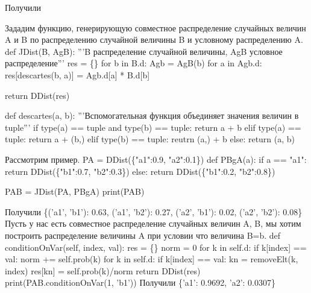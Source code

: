 Получили
\nwenddocs{}\moddef{}\plusendmoddef\nwstartdeflinemarkup{}
\nwendcode{}\nwdocspar

Зададим функцию, генерирующую совместное распределение 
случайных величин A и B по распределению случайной величины 
B и условному распределению A.
\nwenddocs{}\plusendmoddef\nwstartdeflinemarkup\nwenddeflinemarkup
def JDist(B, AgB):
        '''B распределение случайной величины,
        AgB условное распределение'''
        res = \{\}
        for b in B.d:
                Agb = AgB(b)
                for a in Agb.d:
                        res[descartes(b, a)] = Agb.d[a] * B.d[b]
                        
        return DDist(res)

def descartes(a, b):
        '''Вспомогательная функция
        объединяет значения величин в tuple'''
        if type(a) == tuple and type(b) == tuple:
                return a + b
        elif type(a) == tuple:
                return a + (b,)
        elif type(b) == tuple:
                reutrn (a,) + b
        else:
                return (a, b)

\nwendcode{}\nwdocspar

Рассмотрим пример.
\nwenddocs{}\plusendmoddef\nwstartdeflinemarkup\nwenddeflinemarkup
PA = DDist(\{"a1":0.9, "a2":0.1\})
def PBgA(a):
        if a == "a1":
                return DDist(\{"b1":0.7, "b2":0.3\})
        else:
                return DDist(\{"b1":0.2, "b2":0.8\})

PAB = JDist(PA, PBgA)
print(PAB)
\nwendcode{}\nwdocspar

Получили
\nwenddocs{}\moddef{}\plusendmoddef\nwstartdeflinemarkup\nwenddeflinemarkup
\{('a1', 'b1'): 0.63, ('a1', 'b2'): 0.27, ('a2', 'b1'): 0.02, ('a2', 'b2'): 0.08\}
\nwendcode{}\nwdocspar
Пусть у нас есть совместное распределение случайных величин
A, B, мы хотим построить распределение величины A при условии
что величина B=b.
\nwenddocs{}\endmoddef\nwstartdeflinemarkup\nwenddeflinemarkup
def conditionOnVar(self, index, val):
        res = \{\}
        norm = 0
        for k in self.d:
                if k[index] == val:
                        norm += self.prob(k)
        for k in self.d:
                if k[index] == val:
                        kn = removeElt(k, index)
                        res[kn] = self.prob(k)/norm
        return DDist(res)       
\nwendcode{}\nwdocspar
\nwenddocs{}\plusendmoddef\nwstartdeflinemarkup\nwenddeflinemarkup
print(PAB.conditionOnVar(1, 'b1'))
\nwendcode{}\nwdocspar
Получили
\nwenddocs{}\moddef{}\plusendmoddef\nwstartdeflinemarkup\nwenddeflinemarkup
\{'a1': 0.9692, 'a2': 0.0307\}
\nwendcode{}\nwdocspar
\nwenddocs{}
